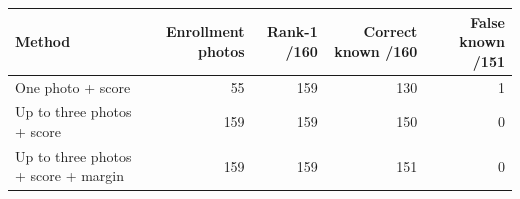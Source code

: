 \begin{tabular}{lrrrr}
\hline
Method & Enrollment photos & Rank-1 /160 & Correct known /160 & False known /151 \\
\hline
One photo + score & 55 & 159 & 130 & 1 \\
Up to three photos + score & 159 & 159 & 150 & 0 \\
Up to three photos + score + margin & 159 & 159 & 151 & 0 \\
\hline
\end{tabular}
